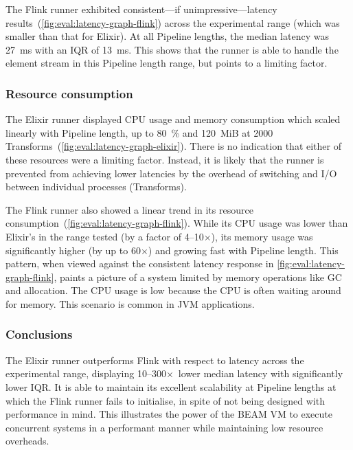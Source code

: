 The Flink runner exhibited consistent---if unimpressive---latency results~(\cref{fig:eval:latency-graph-flink}) across the experimental range (which was smaller than that for Elixir).
At all Pipeline lengths, the median latency was \SI{27}{\milli\second} with an IQR of \SI{13}{\milli\second}.
This shows that the runner is able to handle the element stream in this Pipeline length range, but points to a limiting factor.

\subsubsection{Resource consumption}

The Elixir runner displayed CPU usage and memory consumption which scaled linearly with Pipeline length, up to \SI{80}{\percent} and \SI{120}{MiB} at \num{2000} Transforms~(\cref{fig:eval:latency-graph-elixir}).
There is no indication that either of these resources were a limiting factor.
Instead, it is likely that the runner is prevented from achieving lower latencies by the overhead of switching and I/O between individual processes (Transforms).

The Flink runner also showed a linear trend in its resource consumption~(\cref{fig:eval:latency-graph-flink}).
While its CPU usage was lower than Elixir's in the range tested (by a factor of \num{4}--\num{10}$\times$), its memory usage was significantly higher (by up to \num{60}$\times$) and growing fast with Pipeline length.
This pattern, when viewed against the consistent latency response in \cref{fig:eval:latency-graph-flink}, paints a picture of a system limited by memory operations like GC and allocation.
The CPU usage is low because the CPU is often waiting around for memory.
This scenario is common in JVM applications.

\subsubsection{Conclusions}

The Elixir runner outperforms Flink with respect to latency across the experimental range, displaying \num{10}--\num{300}$\times$~lower median latency with significantly lower IQR.
It is able to maintain its excellent scalability at Pipeline lengths at which the Flink runner fails to initialise, in spite of not being designed with performance in mind.
This illustrates the power of the BEAM VM to execute concurrent systems in a performant manner while maintaining low resource overheads.

